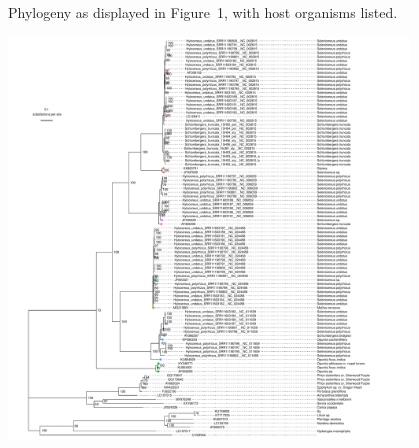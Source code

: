 \documentclass[11pt]{article}
\begin{document}
\begin{suppfigure}
\centering
\caption{
Phylogeny as displayed in {Figure~1}, with host organisms listed.
}
\includegraphics[width=0.8\textwidth]{supplementaryinfo/tree_rect_ufboot_hosts.pdf}
\label{fig:genetree5}
\end{suppfigure}
\clearpage
%
\end{document}
